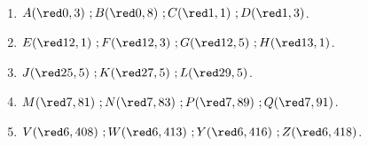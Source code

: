    \ \\ [-5mm]
   \begin{enumerate}
      \item $A({\red 0,3})   ~; \hfill B({\red 0,8})   ~; \hfill C({\red 1,1})  ~; \hfill D({\red 1,3})$.
      \item $E({\red 12,1})  ~; \hfill F({\red 12,3})  ~; \hfill G({\red 12,5}) ~; \hfill H({\red 13,1})$.
      \item $J({\red 25,5})  ~; \hfill K({\red 27,5})  ~; \hfill L({\red 29,5})$.
      \item $M({\red 7,81})  ~; \hfill N({\red 7,83})  ~; \hfill P({\red 7,89})  ~; \hfill Q({\red 7,91})$.
      \item $V({\red 6,408}) ~; \hfill W({\red 6,413}) ~; \hfill Y({\red 6,416}) ~; \hfill Z({\red 6,418})$.
   \end{enumerate}
